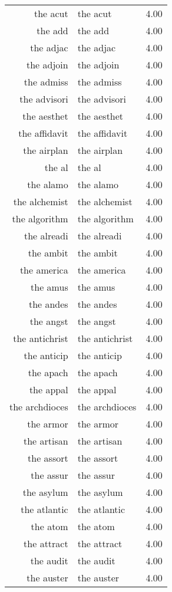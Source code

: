 \begin{table}[ht]
\begin{tabular}{rlr}
  the acut & the acut & 4.00 \\ 
  the add & the add & 4.00 \\ 
  the adjac & the adjac & 4.00 \\ 
  the adjoin & the adjoin & 4.00 \\ 
  the admiss & the admiss & 4.00 \\ 
  the advisori & the advisori & 4.00 \\ 
  the aesthet & the aesthet & 4.00 \\ 
  the affidavit & the affidavit & 4.00 \\ 
  the airplan & the airplan & 4.00 \\ 
  the al & the al & 4.00 \\ 
  the alamo & the alamo & 4.00 \\ 
  the alchemist & the alchemist & 4.00 \\ 
  the algorithm & the algorithm & 4.00 \\ 
  the alreadi & the alreadi & 4.00 \\ 
  the ambit & the ambit & 4.00 \\ 
  the america & the america & 4.00 \\ 
  the amus & the amus & 4.00 \\ 
  the andes & the andes & 4.00 \\ 
  the angst & the angst & 4.00 \\ 
  the antichrist & the antichrist & 4.00 \\ 
  the anticip & the anticip & 4.00 \\ 
  the apach & the apach & 4.00 \\ 
  the appal & the appal & 4.00 \\ 
  the archdioces & the archdioces & 4.00 \\ 
  the armor & the armor & 4.00 \\ 
  the artisan & the artisan & 4.00 \\ 
  the assort & the assort & 4.00 \\ 
  the assur & the assur & 4.00 \\ 
  the asylum & the asylum & 4.00 \\ 
  the atlantic & the atlantic & 4.00 \\ 
  the atom & the atom & 4.00 \\ 
  the attract & the attract & 4.00 \\ 
  the audit & the audit & 4.00 \\ 
  the auster & the auster & 4.00 \\ 

\end{tabular}
\end{table}

